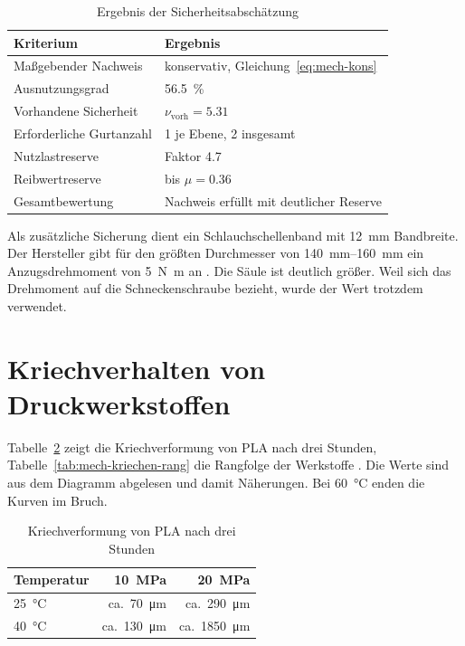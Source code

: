 \begin{table}[H]
    \centering
    \caption{Ergebnis der Sicherheitsabschätzung}
    \label{tab:mech-ergebnis}
    \begin{tabular}{ll}
        \toprule
        \textbf{Kriterium} & \textbf{Ergebnis} \\
        \midrule
        Maßgebender Nachweis     & konservativ, Gleichung~\eqref{eq:mech-kons} \\
        Ausnutzungsgrad          & \SI{56,5}{\percent} \\
        Vorhandene Sicherheit    & $\nu_{\mathrm{vorh}} = \num{5,31}$ \\
        Erforderliche Gurtanzahl & 1 je Ebene, 2 insgesamt \\
        Nutzlastreserve          & Faktor \num{4,7} \\
        Reibwertreserve          & bis $\mu = \num{0,36}$ \\
        \midrule
        Gesamtbewertung          & Nachweis erfüllt mit deutlicher Reserve \\
        \bottomrule
    \end{tabular}
\end{table}

Als zusätzliche Sicherung dient ein Schlauchschellenband mit \SI{12}{\milli\metre} Bandbreite. Der Hersteller gibt für den größten Durchmesser von \SIrange{140}{160}{\milli\metre} ein Anzugsdrehmoment von \SI{5}{\newton\metre} an .
 Die Säule ist deutlich größer. Weil sich das Drehmoment auf die Schneckenschraube bezieht, wurde der Wert trotzdem verwendet.

\section{Kriechverhalten von Druckwerkstoffen}
\label{app:mech-kriechen}
Tabelle~\ref{tab:mech-kriechen-pla} zeigt die Kriechverformung von PLA nach drei Stunden, Tabelle~\ref{tab:mech-kriechen-rang} die Rangfolge der Werkstoffe . Die Werte sind aus dem Diagramm abgelesen und damit Näherungen. Bei \SI{60}{\degreeCelsius} enden die Kurven im Bruch.

\begin{table}[H]
    \centering
    \caption{Kriechverformung von PLA nach drei Stunden}
    \label{tab:mech-kriechen-pla}
    \begin{tabular}{lrr}
        \toprule
        \textbf{Temperatur} & \textbf{\SI{10}{\mega\pascal}} & \textbf{\SI{20}{\mega\pascal}} \\
        \midrule
        \SI{25}{\degreeCelsius} & ca.~\SI{70}{\micro\metre}  & ca.~\SI{290}{\micro\metre} \\
        \SI{40}{\degreeCelsius} & ca.~\SI{130}{\micro\metre} & ca.~\SI{1850}{\micro\metre} \\
        \bottomrule
    \end{tabular}
\end{table}

